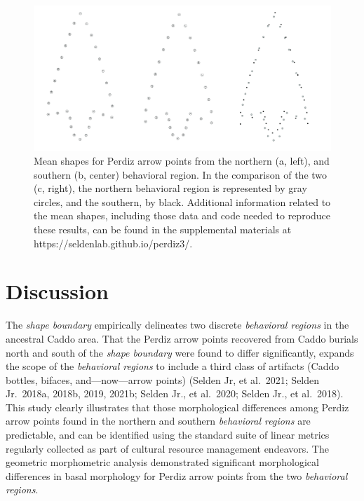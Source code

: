 \documentclass[smallextended]{svjour3}       %
\begin{document}
\begin{figure}
\includegraphics[width=1\linewidth]{ms-figs/figure5} \caption{Mean shapes for Perdiz arrow points from the northern (a, left), and southern (b, center) behavioral region. In the comparison of the two (c, right), the northern behavioral region is represented by gray circles, and the southern, by black. Additional information related to the mean shapes, including those data and code needed to reproduce these results, can be found in the supplemental materials at https://seldenlab.github.io/perdiz3/.}\label{fig:fig5}
\end{figure}

\hypertarget{discussion}{%
\section{Discussion}\label{discussion}}

The \emph{shape boundary} empirically delineates two discrete
\emph{behavioral regions} in the ancestral Caddo area. That the Perdiz
arrow points recovered from Caddo burials north and south of the
\emph{shape boundary} were found to differ significantly, expands the
scope of the \emph{behavioral regions} to include a third class of
artifacts (Caddo bottles, bifaces, and---now---arrow points) (Selden Jr,
et al.~2021; Selden Jr.~2018a, 2018b, 2019, 2021b; Selden Jr., et
al.~2020; Selden Jr., et al.~2018). This study clearly illustrates that
those morphological differences among Perdiz arrow points found in the
northern and southern \emph{behavioral regions} are predictable, and can
be identified using the standard suite of linear metrics regularly
collected as part of cultural resource management endeavors. The
geometric morphometric analysis demonstrated significant morphological
differences in basal morphology for Perdiz arrow points from the two
\emph{behavioral regions}.
\end{document}

